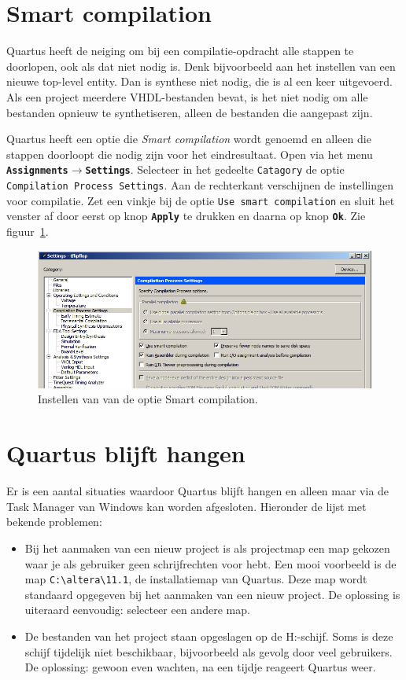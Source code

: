 \documentclass[a4paper,12pt,fleqn,twoside]{book}
\def\tutpicscale{0.455}
\newcommand{\menu}[1]{\texttt{\textbf{#1}}}
\newcommand{\knop}[1]{\texttt{\textbf{#1}}}
\newcommand{\naam}[1]{\texttt{#1}}
\def\pijl{$\rightarrow$}%
\begin{document}
\section{Smart compilation}
Quartus heeft de neiging om bij een compilatie-opdracht alle stappen te
doorlopen, ook als dat niet nodig is. Denk bijvoorbeeld aan het instellen van
een nieuwe top-level entity. Dan is synthese niet nodig, die is al een keer
uitgevoerd. Als een project meerdere VHDL-bestanden bevat, is het niet nodig
om alle bestanden opnieuw te synthetiseren, alleen de bestanden die aangepast
zijn.

Quartus heeft een optie die \textsl{Smart compilation} wordt genoemd en
alleen die stappen doorloopt die nodig zijn voor het eindresultaat. Open via
het menu \menu{Assignments\pijl{}Settings}. Selecteer in het gedeelte
\naam{Catagory} de optie \naam{Compilation Process Settings}. Aan de 
rechterkant verschijnen de instellingen voor compilatie. Zet een vinkje
bij de optie \naam{Use smart compilation} en sluit het venster af
door eerst op knop \knop{Apply} te drukken en daarna op knop \knop{Ok}.
Zie figuur~\ref{fig:225smartcompilation}.

\begin{figure}[H]
\centering
\includegraphics[scale=\tutpicscale]{225smartcompilation.png}
\caption{Instellen van van de optie Smart compilation.}
\label{fig:225smartcompilation}
\end{figure}

\section{Quartus blijft hangen}
Er is een aantal situaties waardoor Quartus blijft hangen en alleen maar
via de Task Manager van Windows kan worden afgesloten. Hieronder de lijst met
bekende problemen:

\begin{itemize}\itemsep-1pt
\item Bij het aanmaken van een nieuw project is als projectmap een map gekozen
      waar je als gebruiker geen schrijfrechten voor hebt. Een mooi voorbeeld
      is de map \lstinline|C:\altera\11.1|, de installatiemap van Quartus.
      Deze map wordt standaard opgegeven bij het aanmaken van een nieuw
      project. De oplossing is uiteraard eenvoudig: selecteer een andere map.
\item De bestanden van het project staan opgeslagen op de H:-schijf. Soms is
      deze schijf tijdelijk niet beschikbaar, bijvoorbeeld als gevolg door
      veel gebruikers. De oplossing: gewoon even wachten, na een tijdje
      reageert Quartus weer.
\end{itemize}
\end{document}
